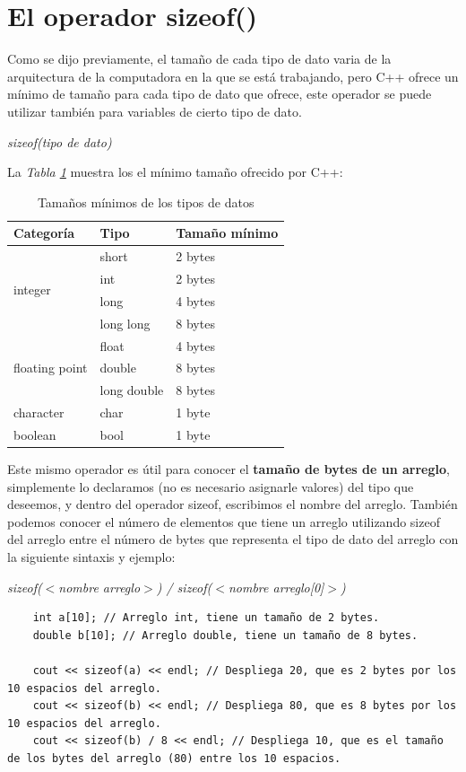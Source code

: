 \section{El operador sizeof()}
\hspace{0.55cm}Como se dijo previamente, el tamaño de cada tipo de dato varia de la arquitectura de la computadora en la que se está trabajando, pero C++ ofrece un mínimo de tamaño para cada tipo de dato que ofrece, este operador se puede utilizar también para variables de cierto tipo de dato.\begin{center}\textit{sizeof(tipo de dato)}\end{center}
La \textit{Tabla \ref{tab: 7}} muestra los el mínimo tamaño ofrecido por C++:
\begin{table}[H]
    \begin{center}
        \caption{Tamaños mínimos de los tipos de datos}
        \label{tab: 7}
        \begin{tabular}{m{3cm} m{3cm} m{3cm}}
            \hline
            \textbf{Categoría} & \textbf{Tipo} & \textbf{Tamaño mínimo} \\
            \hline
            \multirow{4}{3cm}{integer}&short&2 bytes \\
            &int&2 bytes \\
            &long&4 bytes \\
            &long long&8 bytes \\ \hline
            \multirow{3}{3cm}{floating point}&float&4 bytes \\
            &double&8 bytes \\
            &long double&8 bytes \\ \hline
            character&char&1 byte \\ \hline
            boolean&bool&1 byte \\
            \hline
        \end{tabular}
    \end{center}    
\end{table}

Este mismo operador es útil para conocer el \textbf{tamaño de bytes de un arreglo}, simplemente lo declaramos (no es necesario asignarle valores) del tipo que deseemos, y dentro del operador sizeof, escribimos el nombre del arreglo. También podemos conocer el número de elementos que tiene un arreglo utilizando sizeof del arreglo entre el número de bytes que representa el tipo de dato del arreglo con la siguiente sintaxis y ejemplo:
\begin{center}
	\textit{sizeof($<$nombre arreglo$>$) / sizeof($<$nombre arreglo[0]$>$)}
\end{center}
\begin{lstlisting}
    int a[10]; // Arreglo int, tiene un tamaño de 2 bytes.
    double b[10]; // Arreglo double, tiene un tamaño de 8 bytes.
    
    cout << sizeof(a) << endl; // Despliega 20, que es 2 bytes por los 10 espacios del arreglo.
    cout << sizeof(b) << endl; // Despliega 80, que es 8 bytes por los 10 espacios del arreglo.
    cout << sizeof(b) / 8 << endl; // Despliega 10, que es el tamaño de los bytes del arreglo (80) entre los 10 espacios.
\end{lstlisting}

